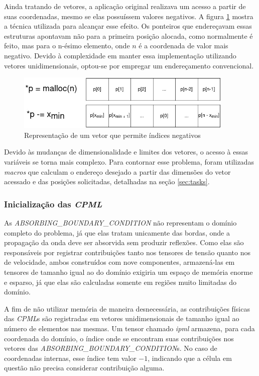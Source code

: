 \documentclass[cic,tc]{iiufrgs}
\begin{document}
Ainda tratando de vetores, a aplicação original realizava um acesso a partir de suas coordenadas, mesmo se elas possuíssem valores negativos. A figura \ref{fig:negative_index} mostra a
técnica utilizada para alcançar esse efeito. Os ponteiros que endereçavam essas estruturas apontavam não para a primeira posição alocada, como normalmente é feito, mas para o n-ésimo elemento,
onde $n$ é a coordenada de valor mais negativo. Devido à complexidade em manter essa implementação utilizando vetores unidimensionais, optou-se por empregar um endereçamento convencional.

\begin{figure}[!htb]
    \caption{Representação de um vetor que permite índices negativos}
    \begin{center}
      \includegraphics[width=28em]{negative_index}
    \end{center}
    \label{fig:negative_index}
\end{figure}

Devido às mudanças de dimensionalidade e limites dos vetores, o acesso à essas variáveis se torna mais complexo. Para contornar esse problema, foram utilizadas \textit{macros} que calculam
o endereço desejado a partir das dimensões do vetor acessado e das posições solicitadas, detalhadas na seção \ref{sec:tasks}.

\subsubsection{Inicialização das \textit{CPML}}

As \textit{ABSORBING\_BOUNDARY\_CONDITION} não representam o domínio completo do
problema, já que elas tratam unicamente das bordas, onde a propagação da onda deve ser absorvida sem produzir reflexões. Como elas são
responsáveis por registrar contribuições tanto nos tensores de tensão quanto nos de velocidade, ambos construídos com nove componentes,
armazená-las em tensores de tamanho igual ao do domínio exigiria um espaço de memória enorme e esparso, já que elas são calculadas somente
em regiões muito limitadas do domínio.

A fim de não utilizar memória de maneira desnecessária, as contribuições físicas das \textit{CPML}s são registradas em vetores
unidimensionais de tamanho igual ao número de elementos nas mesmas. Um tensor chamado \textit{ipml} armazena, para cada coordenada
do domínio, o índice onde se encontram suas contribuições nos vetores das \textit{ABSORBING\_BOUNDARY\_CONDITION}s. No caso de coordenadas
internas, esse índice tem valor $-1$, indicando que a célula em questão não precisa considerar contribuição alguma. 
\end{document}
